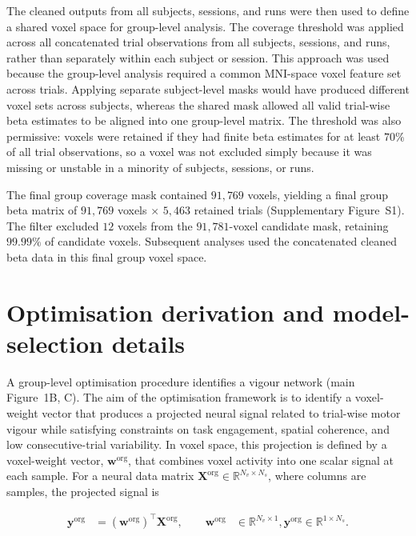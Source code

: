 \documentclass[utf8]{frontiers_suppmat}
\begin{document}
The cleaned outputs from all subjects, sessions, and runs were then used to define a shared voxel space for group-level analysis. The coverage threshold was applied across all concatenated trial observations from all subjects, sessions, and runs, rather than separately within each subject or session. This approach was used because the group-level analysis required a common MNI-space voxel feature set across trials. Applying separate subject-level masks would have produced different voxel sets across subjects, whereas the shared mask allowed all valid trial-wise beta estimates to be aligned into one group-level matrix. The threshold was also permissive: voxels were retained if they had finite beta estimates for at least $70\%$ of all trial observations, so a voxel was not excluded simply because it was missing or unstable in a minority of subjects, sessions, or runs.

The final group coverage mask contained $91{,}769$ voxels, yielding a final group beta matrix of $91{,}769$ voxels $\times$ $5{,}463$ retained trials (Supplementary Figure~S1). The filter excluded $12$ voxels from the $91{,}781$-voxel candidate mask, retaining $99.99\%$ of candidate voxels. Subsequent analyses used the concatenated cleaned beta data in this final group voxel space.

\FloatBarrier
\section{Optimisation derivation and model-selection details}\label{app:optimization_full}

A group-level optimisation procedure identifies a vigour network
(main Figure~1B, C). The aim of the optimisation framework is to identify a voxel-weight vector that produces a projected neural signal related to trial-wise motor vigour while satisfying constraints on task engagement, spatial coherence, and low consecutive-trial variability. In voxel space, this projection is defined by a voxel-weight vector, \(\mathbf{w}^{\mathrm{org}}\), that combines voxel activity into one scalar signal at each sample. For a neural data matrix
\(\mathbf{X}^{\mathrm{org}} \in \mathbb{R}^{N_v \times N_s}\), where columns are samples, the projected signal is

\begin{equation*}
\begin{aligned}
\mathbf{y}^{\mathrm{org}}
&=
\left(\mathbf{w}^{\mathrm{org}}\right)^\top
\mathbf{X}^{\mathrm{org}},
\qquad
\mathbf{w}^{\mathrm{org}}
&\in \mathbb{R}^{N_v \times 1},
\mathbf{y}^{\mathrm{org}}
\in \mathbb{R}^{1 \times N_s}.
\end{aligned}
\label{eq:generic_projection}
\end{equation*}
\end{document}
